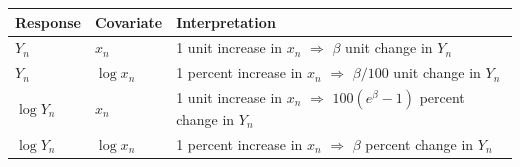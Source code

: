 \documentclass[
  12pt,
  oneside,openany]{book}
\begin{document}
\begin{longtable}[]{@{}lll@{}}
\toprule
\begin{minipage}[b]{0.24\columnwidth}\raggedright
Response\strut
\end{minipage} & \begin{minipage}[b]{0.26\columnwidth}\raggedright
Covariate\strut
\end{minipage} & \begin{minipage}[b]{0.41\columnwidth}\raggedright
Interpretation\strut
\end{minipage}\tabularnewline
\midrule
\endhead
\begin{minipage}[t]{0.24\columnwidth}\raggedright
\(Y_n\)\strut
\end{minipage} & \begin{minipage}[t]{0.26\columnwidth}\raggedright
\(x_n\)\strut
\end{minipage} & \begin{minipage}[t]{0.41\columnwidth}\raggedright
1 unit increase in \(x_n\) \(\Rightarrow\) \(\beta\) unit change in \(Y_n\)\strut
\end{minipage}\tabularnewline
\begin{minipage}[t]{0.24\columnwidth}\raggedright
\(Y_n\)\strut
\end{minipage} & \begin{minipage}[t]{0.26\columnwidth}\raggedright
\(\log x_n\)\strut
\end{minipage} & \begin{minipage}[t]{0.41\columnwidth}\raggedright
1 percent increase in \(x_n\) \(\Rightarrow\) \(\beta / 100\) unit change in \(Y_n\)\strut
\end{minipage}\tabularnewline
\begin{minipage}[t]{0.24\columnwidth}\raggedright
\(\log Y_n\)\strut
\end{minipage} & \begin{minipage}[t]{0.26\columnwidth}\raggedright
\(x_n\)\strut
\end{minipage} & \begin{minipage}[t]{0.41\columnwidth}\raggedright
1 unit increase in \(x_n\) \(\Rightarrow\) \(100(e^\beta - 1)\) percent change in \(Y_n\)\strut
\end{minipage}\tabularnewline
\begin{minipage}[t]{0.24\columnwidth}\raggedright
\(\log Y_n\)\strut
\end{minipage} & \begin{minipage}[t]{0.26\columnwidth}\raggedright
\(\log x_n\)\strut
\end{minipage} & \begin{minipage}[t]{0.41\columnwidth}\raggedright
1 percent increase in \(x_n\) \(\Rightarrow\) \(\beta\) percent change in \(Y_n\)\strut
\end{minipage}\tabularnewline
\bottomrule
\end{longtable}
\end{document}
